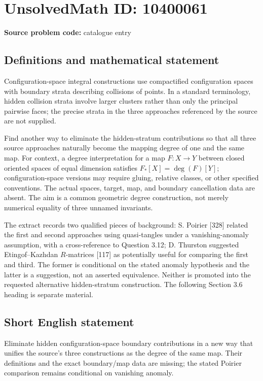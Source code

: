 \documentclass[11pt]{article}
\begin{document}
\section*{UnsolvedMath ID: 10400061}
\textbf{Source problem code:} catalogue entry
\subsection{Definitions and mathematical statement}
Configuration-space integral constructions use compactified configuration spaces with boundary strata describing collisions of points. In a standard terminology, hidden collision strata involve larger clusters rather than only the principal pairwise faces; the precise strata in the three approaches referenced by the source are not supplied.

Find another way to eliminate the hidden-stratum contributions so that all three source approaches naturally become the mapping degree of one and the same map. For context, a degree interpretation for a map $F:X\to Y$ between closed oriented spaces of equal dimension satisfies $F_*[X]=\deg(F)[Y]$; configuration-space versions may require gluing, relative classes, or other specified conventions. The actual spaces, target, map, and boundary cancellation data are absent. The aim is a common geometric degree construction, not merely numerical equality of three unnamed invariants.

The extract records two qualified pieces of background: S. Poirier [328] related the first and second approaches using quasi-tangles under a vanishing-anomaly assumption, with a cross-reference to Question 3.12; D. Thurston suggested Etingof--Kazhdan $R$-matrices [117] as potentially useful for comparing the first and third. The former is conditional on the stated anomaly hypothesis and the latter is a suggestion, not an asserted equivalence. Neither is promoted into the requested alternative hidden-stratum construction. The following Section 3.6 heading is separate material.
\subsection{Short English statement}
Eliminate hidden configuration-space boundary contributions in a new way that unifies the source's three constructions as the degree of the same map. Their definitions and the exact boundary/map data are missing; the stated Poirier comparison remains conditional on vanishing anomaly.
\end{document}
